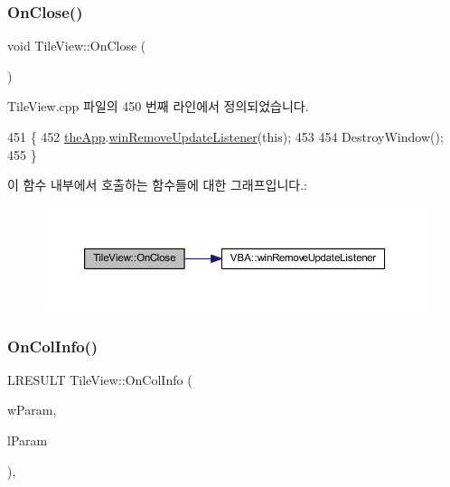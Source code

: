 \subsubsection{\texorpdfstring{On\+Close()}{OnClose()}}
{\footnotesize\ttfamily void Tile\+View\+::\+On\+Close (\begin{DoxyParamCaption}{ }\end{DoxyParamCaption})\hspace{0.3cm}{\ttfamily [protected]}}



Tile\+View.\+cpp 파일의 450 번째 라인에서 정의되었습니다.


\begin{DoxyCode}
451 \{
452   \mbox{\hyperlink{_v_b_a_8cpp_a8095a9d06b37a7efe3723f3218ad8fb3}{theApp}}.\mbox{\hyperlink{class_v_b_a_a2d31a0656df2230310aa8dc9e3a735d3}{winRemoveUpdateListener}}(\textcolor{keyword}{this});
453   
454   DestroyWindow();
455 \}
\end{DoxyCode}
이 함수 내부에서 호출하는 함수들에 대한 그래프입니다.\+:
\nopagebreak
\begin{figure}[H]
\begin{center}
\leavevmode
\includegraphics[width=350pt]{class_tile_view_a88e865b649c2a32c403670cca70ed55c_cgraph}
\end{center}
\end{figure}
\mbox{\label{class_tile_view_ad01d09783bbe107d9837d6847938e564}} 
\subsubsection{\texorpdfstring{On\+Col\+Info()}{OnColInfo()}}
{\footnotesize\ttfamily L\+R\+E\+S\+U\+LT Tile\+View\+::\+On\+Col\+Info (\begin{DoxyParamCaption}\item[{W\+P\+A\+R\+AM}]{w\+Param,  }\item[{L\+P\+A\+R\+AM}]{l\+Param }\end{DoxyParamCaption})\hspace{0.3cm}{\ttfamily [protected]}, {\ttfamily [virtual]}}



